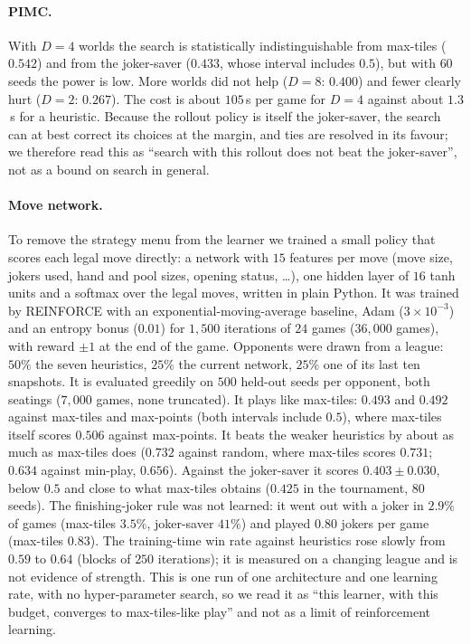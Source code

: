 \documentclass[11pt]{article}
\begin{document}
\paragraph{PIMC.} With $D=4$ worlds the search is statistically indistinguishable from max-tiles ($0.542$) and from the joker-saver ($0.433$, whose interval includes $0.5$), but with $60$ seeds the power is low. More worlds did not help ($D=8$: $0.400$) and fewer clearly hurt ($D=2$: $0.267$). The cost is about $105$\,s per game for $D=4$ against about $1.3$\,s for a heuristic. Because the rollout policy is itself the joker-saver, the search can at best correct its choices at the margin, and ties are resolved in its favour; we therefore read this as ``search with this rollout does not beat the joker-saver'', not as a bound on search in general.

\paragraph{Move network.} To remove the strategy menu from the learner we trained a small policy that scores each legal move directly: a network with $15$ features per move (move size, jokers used, hand and pool sizes, opening status, \dots), one hidden layer of $16$ tanh units and a softmax over the legal moves, written in plain Python. It was trained by REINFORCE with an exponential-moving-average baseline, Adam ($3{\times}10^{-3}$) and an entropy bonus ($0.01$) for $1{,}500$ iterations of $24$ games ($36{,}000$ games), with reward $\pm1$ at the end of the game. Opponents were drawn from a league: $50\%$ the seven heuristics, $25\%$ the current network, $25\%$ one of its last ten snapshots. It is evaluated greedily on $500$ held-out seeds per opponent, both seatings ($7{,}000$ games, none truncated). It plays like max-tiles: $0.493$ and $0.492$ against max-tiles and max-points (both intervals include $0.5$), where max-tiles itself scores $0.506$ against max-points. It beats the weaker heuristics by about as much as max-tiles does ($0.732$ against random, where max-tiles scores $0.731$; $0.634$ against min-play, $0.656$). Against the joker-saver it scores $0.403\pm0.030$, below $0.5$ and close to what max-tiles obtains ($0.425$ in the tournament, $80$ seeds). The finishing-joker rule was not learned: it went out with a joker in $2.9\%$ of games (max-tiles $3.5\%$, joker-saver $41\%$) and played $0.80$ jokers per game (max-tiles $0.83$). The training-time win rate against heuristics rose slowly from $0.59$ to $0.64$ (blocks of $250$ iterations); it is measured on a changing league and is not evidence of strength. This is one run of one architecture and one learning rate, with no hyper-parameter search, so we read it as ``this learner, with this budget, converges to max-tiles-like play'' and not as a limit of reinforcement learning.
\end{document}
